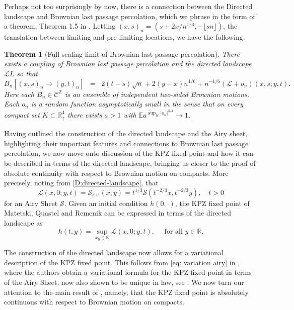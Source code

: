 \documentclass[12pt]{report}
\theoremstyle{plain}
\newtheorem{theorem}{Theorem}[section]
\newcommand{\R}{\ensuremath{\mathbb{R}}}
\newcommand{\Z}{\ensuremath{\mathbb{Z}}}
\begin{document}
Perhaps not too surprisingly by now, there is a connection between the Directed landscape and Brownian last passage percolation, which we phrase in the form of a theorem, Theorem 1.5 in \cite{DOV}. Letting $(x,s)_n=(s+2x/n^{1/3},-\lfloor sn\rfloor )$, the translation between limiting and pre-limiting locations, we have the following.

\begin{theorem}[Full scaling limit of Brownian last passage percolation]
\label{T:lp-limit}
There exists a coupling of Brownian last passage percolation and the directed landscape $\mathcal{L}L$ so that
$$
B_n[(x,s)_n\to (y,t)_n ]\;\; = \;\;2(t-s)\sqrt{n} + 2(y - x)n^{1/6} + n^{-1/6} (\mathcal{L}+o_n)(x,s;y,t).
$$
Here each $B_n\in \mathcal{C}^{\Z}$ is an ensemble of independent two-sided Brownian motions. Each $o_n$ is a random function asymptotically small in the sense that on every compact set $K\subset \R^4_{\uparrow}$ there exists $a>1$ with
$\mathbb{E} a^{\sup_K |o_n|^{3/4}}\to 1$.
\end{theorem}

Having outlined the construction of the directed landscape and the Airy sheet, highlighting their important features and connections to Brownian last passage percolation, we now move onto discussion of the KPZ fixed point and how it can be described in terms of the directed landscape, bringing us closer to the proof of absolute continuity with respect to Brownian motion on compacts. More precisely, noting from \ref{D:directed-landscape}, that
\[
\mathcal{L}(x,0;y,t) = \mathcal{S}_{t^{1/3}}(x,y) = t^{1/3}\mathcal{S}(t^{-2/3}x, t^{-2/3}y), \quad t>0
\]
\noindent for an Airy Sheet \(\mathcal{S}\). Given an initial condition  \(h(0,\cdot)\), the KPZ fixed point of Matetski, Quastel and Remenik \cite{matetski2021kpz} can be expressed in terms of the directed landscape as
\begin{equation}\label{def: KPZ fixed point}
    h(t,y) = \sup_{x_0\in\R}\mathcal{L}(x,0;y,t), \quad \text{ for all } y\in \R.
\end{equation}

The construction of the directed landscape now allows for a variational description of the KPZ fixed point. This follows from \ref{eq: variation airy} in \cite{matetski2021kpz}, where the authors obtain a variational formula for the KPZ fixed point in terms of the Airy Sheet, now also shown to be unique in law, see \cite{DOV}. We now turn our attention to the main result of \cite{sarkar2021brownian}, namely, that the KPZ fixed point is absolutely continuous with respect to Brownian motion on compacts.
\end{document}
